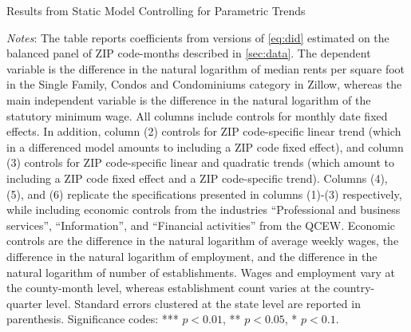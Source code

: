 \clearpage
\begin{table}[h!]
	\caption{Results from Static Model Controlling for Parametric Trends}
	\label{tab:did_trend}
	\centering
	\resizebox{1\textwidth}{!}{
	
	}
	\begin{minipage}{0.95\textwidth} \footnotesize
		\vspace{3mm} 
		\textit{Notes}: The table reports coefficients from versions of \autoref{eq:did} 
		estimated on the balanced panel of ZIP code-months described in \autoref{sec:data}. 
		The dependent variable is the difference in the natural logarithm of median	rents 
		per	square foot in the Single Family, Condos and Condominiums category in Zillow, 
		whereas the main independent variable is the difference in the natural logarithm
		of the statutory minimum wage. All columns include controls for monthly date fixed 
		effects. In addition, column (2) controls for ZIP code-specific linear trend (which 
		in a differenced model amounts to including a ZIP code fixed effect), and column (3) 
		controls for ZIP code-specific linear and quadratic trends (which amount to 
		including a ZIP code fixed effect and a ZIP code-specific trend). Columns (4), (5), 
		and (6) replicate the specifications presented in columns (1)-(3) respectively, while 
		including economic controls from the industries ``Professional and business services'', 
		``Information'', and ``Financial activities'' from the QCEW. Economic controls are 
		the difference in the natural logarithm of average weekly wages, the difference in 
		the natural logarithm of employment, and the difference in the natural logarithm 
		of number of establishments. Wages and employment vary at the county-month level,
		whereas establishment count varies at the country-quarter level.
		Standard errors clustered at the state level are reported in parenthesis. Significance 
		codes: *** $p < 0.01$, ** $p < 0.05$, * $p < 0.1$.
	\end{minipage}
\end{table}

